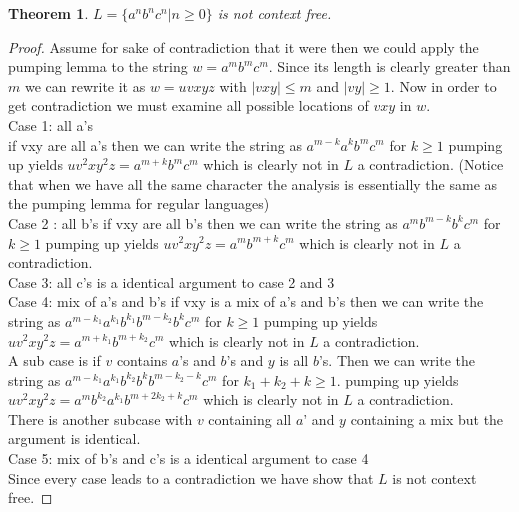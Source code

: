 \documentclass[11pt]{exam}
\newtheorem{theorem}{Theorem}[section]
\begin{document}
\begin{theorem}
$L = \{a^nb^nc^n | n \geq 0\}$ is not context free.
\end{theorem}
\begin{proof}
 Assume for sake of contradiction that it were then we could apply the pumping lemma to the string $w = a^mb^mc^m$. Since its length is clearly greater than $m$ we can rewrite it as $w = uvxyz$ with $|vxy| \leq m$ and $|vy| \geq 1$. Now in order to get  contradiction we must examine all possible locations of $vxy$ in $w$.\\

Case 1: all a's\\
if vxy are all a's then we can write the string as $a^{m-k}a^kb^mc^m$ for $k \geq 1$ pumping up yields $uv^2xy^2z = a^{m+k}b^mc^m$ which is clearly not in $L$ a contradiction. (Notice that when we have all the same character the analysis is essentially the same as the pumping lemma for regular languages)\\

Case 2 : all b's 
if vxy are all b's then we can write the string as $a^mb^{m-k}b^kc^m$ for $k \geq 1$ pumping up yields $uv^2xy^2z = a^mb^{m+k}c^m$ which is clearly not in $L$ a contradiction. \\

Case 3: all c's is a identical argument to case 2 and 3\\

Case 4: mix of a's and b's
if vxy is a mix of a's and b's then we can write the string as $a^{m-k_1}a^{k_1}b^{k_1}b^{m-k_2}b^kc^m$ for $k \geq 1$ pumping up yields $uv^2xy^2z = a^{m+k_1}b^{m+k_2}c^m$ which is clearly not in $L$ a contradiction.\\

A sub case is if $v$ contains $a$'s and $b$'s and $y$ is all $b$'s. Then we can write the string as
$a^{m-k_1}a^{k_1}b^{k_2}b^kb^{m-k_2-k}c^m$ for $k_1 + k_2 + k \geq 1$. pumping up yields 
$uv^2xy^2z = a^mb^{k_2}a^{k_1}b^{m+2k_2+k}c^m$ which is clearly not in $L$ a contradiction.\\

There is another subcase with $v$ containing all $a$' and $y$ containing a mix but the argument is identical.\\

Case 5: mix of b's and c's is a identical argument to case 4\\

Since every case leads to a contradiction we have show that $L$ is not context free.
\end{proof}
\end{document}
